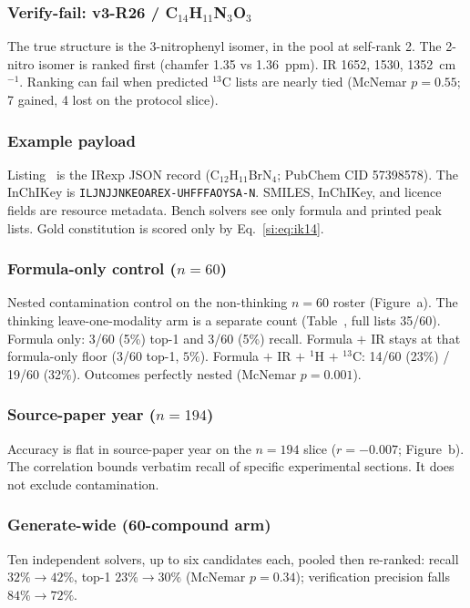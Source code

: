 \subsubsection{Verify-fail: v3-R26 / \texorpdfstring{C$_{14}$H$_{11}$N$_{3}$O$_{3}$}{C14H11N3O3}}

The true structure is the 3-nitrophenyl isomer, in the pool at
self-rank 2.
The 2-nitro isomer is ranked first (chamfer 1.35 vs 1.36~ppm).
IR 1652, 1530, 1352~cm$^{-1}$.
Ranking can fail when predicted $^{13}$C lists are nearly tied
(McNemar $p{=}0.55$; 7 gained, 4 lost on the protocol slice).

\subsubsection{Example payload}

Listing~ is the IRexp JSON record
(C$_{12}$H$_{11}$BrN$_{4}$; PubChem CID 57398578).
The InChIKey is \texttt{ILJNJJNKEOAREX-UHFFFAOYSA-N}.
SMILES, InChIKey, and licence fields are resource metadata.
Bench solvers see only formula and printed peak lists.
Gold constitution is scored only by Eq.~\ref{si:eq:ik14}.

\subsubsection{Formula-only control \texorpdfstring{($n{=}60$)}{(n=60)}}
\label{si:n60}
Nested contamination control on the non-thinking $n{=}60$ roster
(Figure~a).
The thinking leave-one-modality arm is a separate count
(Table~, full lists 35/60).
Formula only: 3/60 (5\%) top-1 and 3/60 (5\%) recall.
Formula $+$ IR stays at that formula-only floor (3/60 top-1, $5\%$).
Formula $+$ IR $+$ $^1$H $+$ $^{13}$C: 14/60 (23\%) / 19/60 (32\%).
Outcomes perfectly nested (McNemar $p{=}0.001$).

\subsubsection{Source-paper year \texorpdfstring{($n{=}194$)}{(n=194)}}
\label{si:year}
Accuracy is flat in source-paper year on the $n{=}194$ slice ($r{=}{-}0.007$;
Figure~b).
The correlation bounds verbatim recall of specific experimental sections.
It does not exclude contamination.

\subsubsection{Generate-wide (60-compound arm)}
Ten independent solvers, up to six candidates each, pooled then re-ranked:
recall $32\%\to 42\%$, top-1 $23\%\to 30\%$
(McNemar $p{=}0.34$); verification precision falls $84\%\to72\%$.

